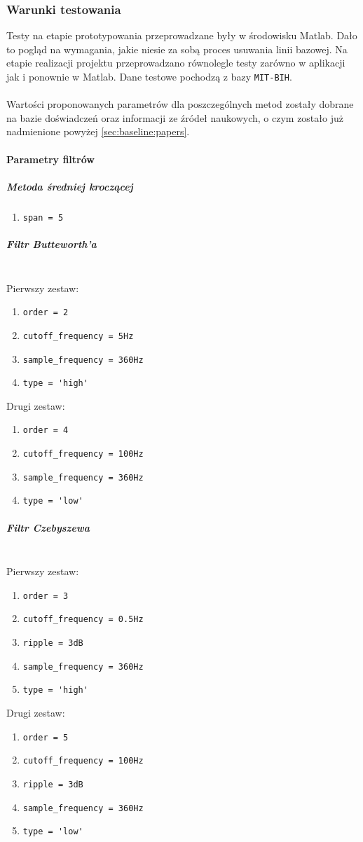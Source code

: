 \documentclass[a4paper, 11pt]{article}
\begin{document}
\subsubsection{Warunki testowania}
\label{sec:baseline:tests}
Testy na etapie prototypowania przeprowadzane były w środowisku Matlab. Dało to pogląd na wymagania, jakie niesie za sobą proces usuwania linii bazowej. Na etapie realizacji projektu przeprowadzano równolegle testy zarówno w aplikacji jak i ponownie w Matlab. Dane testowe pochodzą z bazy \verb|MIT-BIH|.\\\\
Wartości proponowanych parametrów dla poszczególnych metod zostały dobrane na bazie doświadczeń oraz informacji ze źródeł naukowych, o czym zostało już nadmienione powyżej \ref{sec:baseline:papers}.\\

\paragraph{Parametry filtrów}
\subparagraph{Metoda średniej kroczącej}
\begin{enumerate}
\item \verb|span = 5|
\end{enumerate}

\subparagraph{Filtr Butteworth'a}
\mbox{} \\
Pierwszy zestaw:
\begin{enumerate}
\item \verb|order = 2|
\item \verb|cutoff_frequency = 5Hz|
\item \verb|sample_frequency = 360Hz|
\item \verb|type = 'high'|
\end{enumerate}
Drugi zestaw:
\begin{enumerate}
\item \verb|order = 4|
\item \verb|cutoff_frequency = 100Hz|
\item \verb|sample_frequency = 360Hz|
\item \verb|type = 'low'|
\end{enumerate}

\subparagraph{Filtr Czebyszewa}
\mbox{} \\
Pierwszy zestaw:
\begin{enumerate}
\item \verb|order = 3|
\item \verb|cutoff_frequency = 0.5Hz|
\item \verb|ripple = 3dB|
\item \verb|sample_frequency = 360Hz|
\item \verb|type = 'high'|
\end{enumerate}
Drugi zestaw:
\begin{enumerate}
\item \verb|order = 5|
\item \verb|cutoff_frequency = 100Hz|
\item \verb|ripple = 3dB|
\item \verb|sample_frequency = 360Hz|
\item \verb|type = 'low'|
\end{enumerate}
\end{document}
